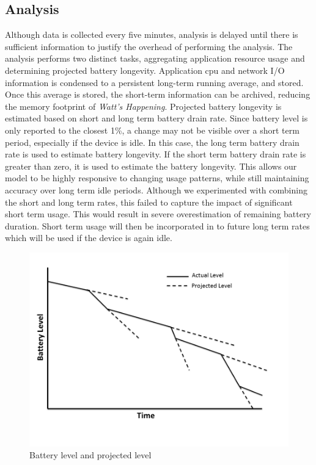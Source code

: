 \subsection*{Analysis}
Although data is collected every five minutes, analysis is delayed until there is sufficient information to justify the overhead of performing the analysis.
The analysis performs two distinct tasks, aggregating application resource usage and determining projected battery longevity.
Application cpu and network I/O information is condensed to a persistent long-term running average, and stored.
Once this average is stored, the short-term information can be archived, reducing the memory footprint of \emph{Watt's Happening}.
Projected battery longevity is estimated based on short and long term battery drain rate.
Since battery level is only reported to the closest 1\%, a change may not be visible over a short term period, especially if the device is idle.
In this case, the long term battery drain rate is used to estimate battery longevity.  
If the short term battery drain rate is greater than zero, it is used to estimate the battery longevity.
This allows our model to be highly responsive to changing usage patterns, while still maintaining accuracy over long term idle periods.
Although we experimented with combining the short and long term rates, this failed to capture the impact of significant short term usage.  
This would result in severe overestimation of remaining battery duration.
Short term usage will then be incorporated in to future long term rates which will be used if the device is again idle.
\begin{figure}[ht!]
	\begin{center}
		\includegraphics[width=\columnwidth]{figs/bat_vs_time.png}
		\caption{Battery level and projected level}
		\label{fig:bat_v_time}
\end{center}
\end{figure}
